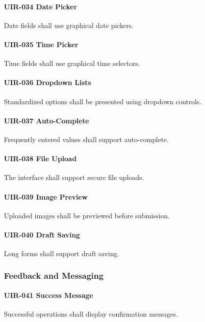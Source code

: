 \paragraph{UIR-034 Date Picker}
Date fields shall use graphical date pickers.

\paragraph{UIR-035 Time Picker}
Time fields shall use graphical time selectors.

\paragraph{UIR-036 Dropdown Lists}
Standardized options shall be presented using dropdown controls.

\paragraph{UIR-037 Auto-Complete}
Frequently entered values shall support auto-complete.

\paragraph{UIR-038 File Upload}
The interface shall support secure file uploads.

\paragraph{UIR-039 Image Preview}
Uploaded images shall be previewed before submission.

\paragraph{UIR-040 Draft Saving}
Long forms shall support draft saving.


\subsubsection*{Feedback and Messaging}

\paragraph{UIR-041 Success Message}
Successful operations shall display confirmation messages.

